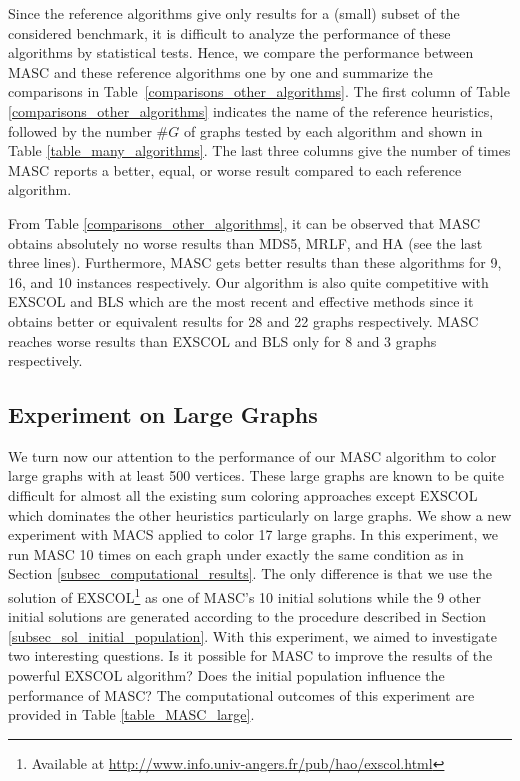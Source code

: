 \documentclass{elsart}
\begin{document}
Since the reference algorithms give only results for a (small) subset of the considered benchmark, it is difficult to analyze the performance of these algorithms by statistical tests. Hence, we compare the performance between MASC and these reference algorithms one by one and summarize the comparisons in Table~\ref{comparisons_other_algorithms}. The first column of Table \ref{comparisons_other_algorithms} indicates the name of the reference heuristics, followed by the number $\#G$ of graphs tested by each algorithm and shown in Table \ref{table_many_algorithms}. The last three columns give the number of times MASC reports a better, equal, or worse result compared to each reference algorithm.

From Table \ref{comparisons_other_algorithms}, it can be observed  that MASC obtains absolutely no worse results than MDS5, MRLF, and HA (see the last three lines). Furthermore, MASC gets better results than these algorithms for 9, 16, and 10 instances respectively. Our algorithm is also quite competitive with EXSCOL and BLS which are the most recent and effective methods since it obtains better or equivalent results for 28 and 22 graphs respectively. MASC reaches worse results than EXSCOL and BLS only for 8 and 3 graphs respectively.


\subsection{Experiment on Large Graphs}
\label{subsec_experiments_large}

We turn now our attention to the performance of our MASC algorithm to color large graphs with at least 500 vertices. These large graphs are known to be quite difficult for almost all the existing sum coloring approaches except EXSCOL which dominates the other heuristics particularly on large graphs. We show a new experiment with MACS applied to color 17 large graphs. In this experiment, we run MASC 10 times on each graph under exactly the same condition as in Section \ref{subsec_computational_results}. The only difference is that we use the solution of EXSCOL\footnote{Available at \url{http://www.info.univ-angers.fr/pub/hao/exscol.html}} as one of MASC's 10 initial solutions while the 9 other initial solutions are generated according to the procedure described in Section \ref{subsec_sol_initial_population}. With this experiment, we aimed to investigate two interesting questions. Is it possible for MASC to improve the results of the powerful EXSCOL algorithm? Does the initial population influence the performance of MASC? The computational outcomes of this experiment are provided in Table \ref{table_MASC_large}.
\end{document}
